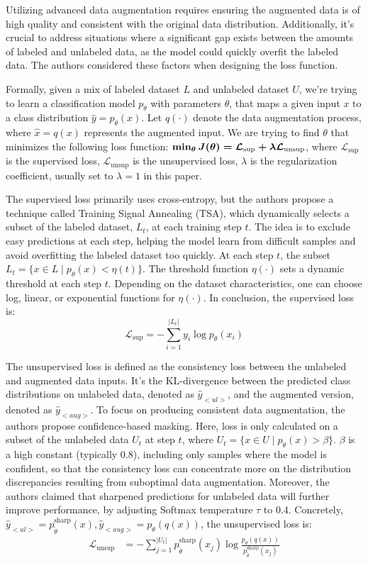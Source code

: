 \documentclass{article}
\begin{document}
Utilizing advanced data augmentation requires ensuring the augmented data is of high 
quality and consistent with the original data distribution. Additionally, it's crucial 
to address situations where a significant gap exists between the amounts of labeled and 
unlabeled data, as the model could quickly overfit the labeled data. The authors 
considered these factors when designing the loss function.

Formally, given a mix of labeled dataset $L$ and unlabeled dataset $U$, we're trying to 
learn a classification model $p_{\theta}$ with parameters $\theta$, that maps a given input $x$
to a class distribution $\hat y = p_{\theta}(x)$. Let $q(\cdot)$ denote 
the data augmentation process, where $\hat x = q(x)$ represents the augmented input. 
We are trying to find $\theta$ that minimizes the following loss function:
$\boldmath \min_{\theta} J(\theta) = \mathcal{L}_{\text{sup}} + \lambda \mathcal{L}_{\text{unsup}}$,
where $\mathcal{L}_{\text{sup}}$ is the supervised loss, $\mathcal{L}_{\text{unsup}}$ is
the unsupervised loss, $\lambda$ is the regularization coefficient, usually
set to $\lambda = 1$ in this paper.

The supervised loss primarily uses cross-entropy, but the authors propose a technique 
called Training Signal Annealing (TSA), which dynamically selects a subset of the labeled 
dataset, $L_t$, at each training step $t$. The idea is to exclude easy predictions at 
each step, helping the model learn from difficult samples and avoid overfitting the 
labeled dataset too quickly. At each step $t$, the subset $L_t = \{x \in L \mid 
p_{\theta}(x) < \eta(t)\}$. The threshold function $\eta(\cdot)$ sets a dynamic 
threshold at each step $t$. Depending on the dataset characteristics, one can choose 
log, linear, or exponential functions for $\eta(\cdot)$. In conclusion, the supervised loss
is:
$$\mathcal{L}_{\text{sup}} = - \sum_{i=1}^{|L_t|} y_i \log p_{\theta}(x_i)$$

The unsupervised loss is defined as the consistency loss between the unlabeled and 
augmented data inputs. It's the KL-divergence between the predicted class distributions 
on unlabeled data, denoted as $\hat y_{<ul>}$, and the augmented version, denoted as 
$\hat y_{<aug>}$.
To focus on producing consistent data augmentation, the authors propose 
confidence-based masking. Here, loss is only calculated on a subset of the unlabeled 
data $U_t$ at step $t$, where $U_t = \{x \in U \mid p_{\theta}(x) > \beta\}$. $\beta$ 
is a high constant (typically 0.8), including only samples where the model is confident,
so that the consistency loss can concentrate more on the distribution discrepancies 
resulting from suboptimal data augmentation.
Moreover, the authors claimed that sharpened predictions for unlabeled data will
further improve performance, by adjusting Softmax temperature $\tau$ to 0.4. Concretely,
$\hat y_{<ul>} = p_{\tilde{\theta}}^{\text{sharp}}(x), \hat y_{<aug>} = p_{\theta}(q(x))$,
the unsupervised loss is:
\begin{align*}
  \mathcal{L}_{\text{unsup}}
  &= - \sum_{j=1}^{|U_t|} p_{\tilde{\theta}}^{\text{sharp}}(x_j) \log 
  \frac{p_{\theta}(q(x))}{p_{\tilde{\theta}}^{\text{sharp}}(x_j)}
\end{align*}
\end{document}
